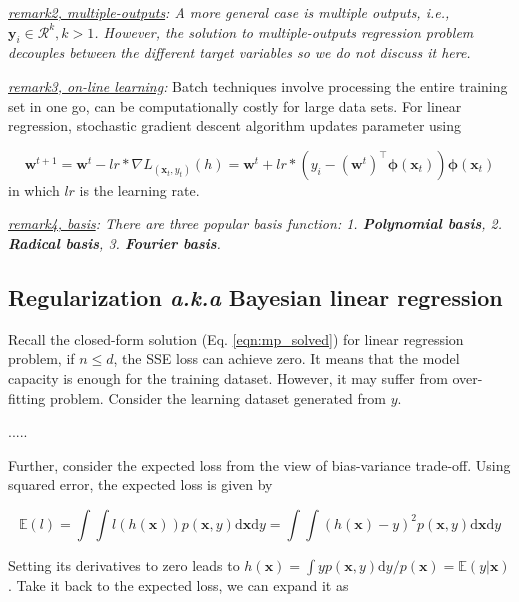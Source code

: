 \documentclass{article}
\begin{document}
	\textit{\underline{remark2, multiple-outputs}: A more general case is multiple outputs, i.e., $\mathbf{y}_i \in \mathcal{R}^k, k>1$. However, the solution to multiple-outputs regression problem decouples between the different target variables so we do not discuss it here.}
	
	\textit{\underline{remark3, on-line learning}:} Batch techniques involve processing the entire training set in one go, can be computationally costly for large data sets. For linear regression, stochastic gradient descent algorithm updates parameter using
	
	\begin{equation*}
	\mathbf{w}^{t+1}=\mathbf{w}^{t} - lr*\nabla L_{(\mathbf{x}_t,y_t)}(h) = \mathbf{w}^{t} + lr* (y_i - (\mathbf{w}^t)^\top \mathbf{\phi} (\mathbf{x}_t)) \mathbf{\phi} (\mathbf{x}_t)
	\end{equation*}
in which $lr$ is the learning rate.

	\textit{\underline{remark4, basis}: There are three popular basis function: 1. \textbf{Polynomial basis}, 2. \textbf{Radical basis}, 3. \textbf{Fourier basis}.}
	
	\subsection{Regularization \textit{a.k.a} Bayesian linear regression}
	
	Recall the closed-form solution (Eq. \ref{eqn:mp_solved}) for linear regression problem, if $n\leq d$, the SSE loss can achieve zero. It means that the model capacity is enough for the training dataset. However, it may suffer from over-fitting problem. Consider the learning dataset generated from $y$.
	
	.....
	
	Further, consider the expected loss from the view of bias-variance trade-off. Using squared error, the expected loss is given by
	
	\begin{equation*}
	\mathbb{E}(l) = \int \int l(h(\mathbf{x})) p(\mathbf{x}, y) \text{d} \mathbf{x} \text{d}y
	= \int \int (h(\mathbf{x})-y)^2 p(\mathbf{x}, y) \text{d} \mathbf{x} \text{d}y
	\end{equation*}
	
Setting its derivatives to zero leads to $h(\mathbf{x}) = \int yp(\mathbf{x}, y) \text{d} y /p(\mathbf{x}) = \mathbb{E}(y|\mathbf{x})$. Take it back to the expected loss, we can expand it as 
\end{document}
